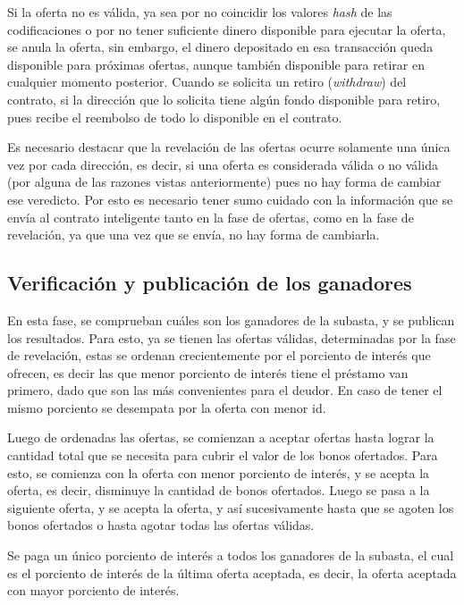       Si la oferta no es válida, ya sea por no coincidir los valores \textit{hash} de las codificaciones o por no tener suficiente 
      dinero disponible para ejecutar la oferta, se anula la oferta, sin embargo, el dinero depositado en esa transacción queda disponible
      para próximas ofertas, aunque también disponible para retirar en cualquier momento posterior. Cuando se solicita un retiro 
      (\textit{withdraw}) del contrato, si la dirección que lo solicita tiene algún fondo disponible para retiro, pues recibe el reembolso
      de todo lo disponible en el contrato.

      Es necesario destacar que la revelación de las ofertas ocurre solamente una única vez por cada dirección, es decir, si una oferta
      es considerada válida o no válida (por alguna de las razones vistas anteriormente) pues no hay forma de cambiar ese veredicto. Por 
      esto es necesario tener sumo cuidado con la información que se envía al contrato inteligente tanto en la fase de ofertas, como en
      la fase de revelación, ya que una vez que se envía, no hay forma de cambiarla.

    \subsection{Verificación y publicación de los ganadores}
      En esta fase, se comprueban cuáles son los ganadores de la subasta, y se publican los resultados. Para esto, ya se tienen las ofertas
      válidas, determinadas por la fase de revelación, estas se ordenan crecientemente por el porciento de interés que ofrecen, es decir
      las que menor porciento de interés tiene el préstamo van primero, dado que son las más convenientes para el deudor. En caso de tener
      el mismo porciento se desempata por la oferta con menor id. 

      Luego de ordenadas las ofertas, se comienzan a aceptar ofertas hasta lograr la cantidad total que se necesita para cubrir el valor
      de los bonos ofertados. Para esto, se comienza con la oferta con menor porciento de interés, 
      y se acepta la oferta, es decir, disminuye la cantidad de bonos ofertados. Luego se pasa a la siguiente oferta, y se acepta la oferta, 
      y así sucesivamente hasta que se agoten los bonos ofertados o hasta agotar todas las ofertas válidas.

      Se paga un único porciento de interés a todos los ganadores de la subasta, el cual es el porciento de interés de la última oferta
      aceptada, es decir, la oferta aceptada con mayor porciento de interés.

